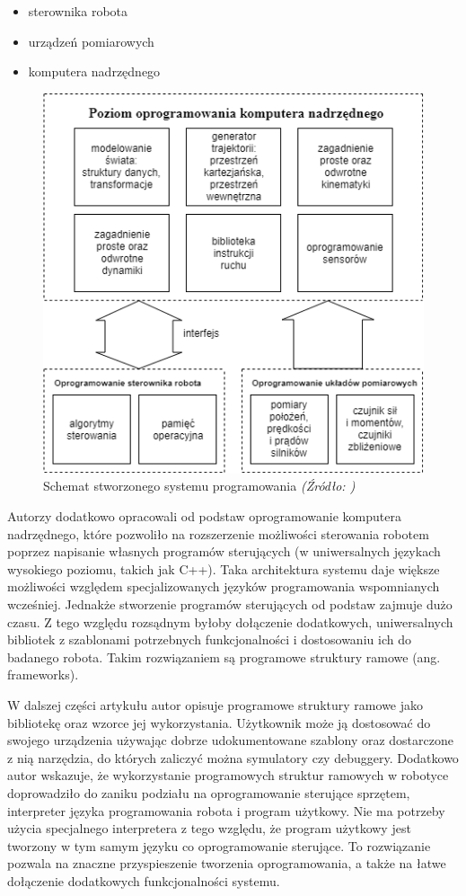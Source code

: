 \documentclass[a4paper, 12pt, twoside]{article}
\begin{document}
\begin{itemize}
\item sterownika robota
\item urządzeń pomiarowych
\item komputera nadrzędnego
\end{itemize}

\begin{figure}[hbt!]
\centering
\includegraphics[width=0.8\linewidth]{images/system_scheme.png}
\caption{Schemat stworzonego systemu programowania\textit{ (Źródło: \cite{systemkozlowski}) } }
\label{fig:system_scheme}
\end{figure}

Autorzy dodatkowo opracowali od podstaw oprogramowanie komputera nadrzędnego, które pozwoliło na rozszerzenie możliwości sterowania robotem poprzez napisanie własnych programów sterujących (w uniwersalnych językach wysokiego poziomu, takich jak C++). Taka architektura systemu daje większe możliwości względem specjalizowanych języków programowania wspomnianych wcześniej. Jednakże stworzenie programów sterujących od podstaw zajmuje dużo czasu. Z tego względu rozsądnym byłoby dołączenie dodatkowych, uniwersalnych bibliotek z szablonami potrzebnych funkcjonalności i dostosowaniu ich do badanego robota. Takim rozwiązaniem są programowe struktury ramowe (ang. frameworks).

W dalszej części artykułu \cite{ramowezielinski} autor opisuje programowe struktury ramowe jako bibliotekę oraz wzorce jej wykorzystania. Użytkownik może ją dostosować do swojego urządzenia używając dobrze udokumentowane szablony oraz dostarczone z nią narzędzia, do których zaliczyć można symulatory czy debuggery. Dodatkowo autor wskazuje, że wykorzystanie programowych struktur ramowych w robotyce doprowadziło do zaniku podziału na oprogramowanie sterujące sprzętem, interpreter języka programowania robota i program użytkowy. Nie ma potrzeby użycia specjalnego interpretera z tego względu, że program użytkowy jest tworzony w tym samym języku co oprogramowanie sterujące. To rozwiązanie pozwala na znaczne przyspieszenie tworzenia oprogramowania, a także na łatwe dołączenie dodatkowych funkcjonalności systemu.
\end{document}
